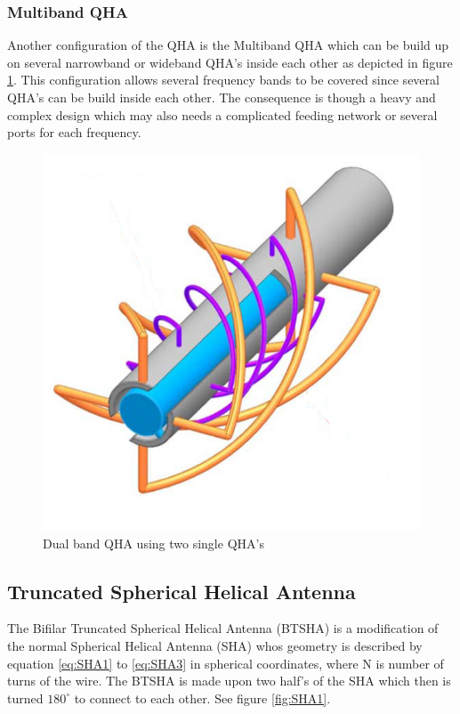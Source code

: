 \subsubsection{Multiband QHA}
Another configuration of the QHA is the Multiband QHA \citep{Bai2014} which can be build up on several narrowband or wideband QHA's inside each other as depicted in figure \ref{fig:TB_QHA}. This configuration allows several frequency bands to be covered since several QHA's can be build inside each other. The consequence is though a heavy and complex design which may also needs a complicated feeding network or several ports for each frequency.  

\begin{figure}[H]
\centering 
\includegraphics[scale = 0.5]{figures/antennas/qha/dual_band}
\caption{Dual band QHA using two single QHA's \citep{Bai2014}}
\label{fig:TB_QHA}
\end{figure} 





\subsection{Truncated Spherical Helical Antenna}
The Bifilar Truncated Spherical Helical Antenna (BTSHA) is a modification of the normal Spherical Helical Antenna (SHA) whos geometry is described by equation \ref{eq:SHA1} to \ref{eq:SHA3} in spherical coordinates, where N is number of turns of the wire. The BTSHA is made upon two half's of the SHA which then is turned $180^\circ$ to connect to each other. See figure \ref{fig:SHA1}.  

